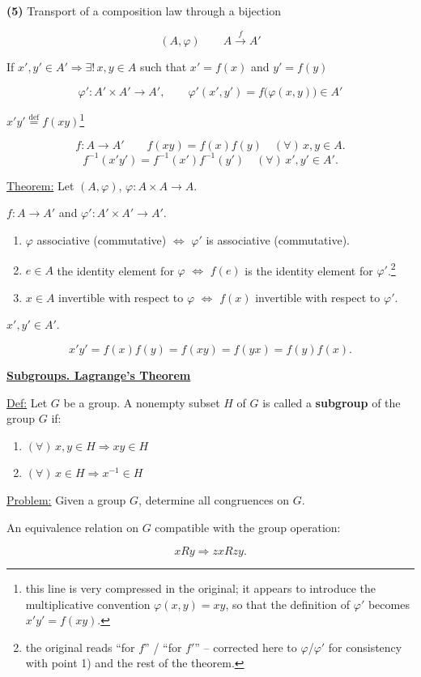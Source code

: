 \documentclass[12pt]{article}
\begin{document}
\noindent\textbf{(5)} Transport of a composition law through a bijection

\[
(A,\varphi) \qquad A \xrightarrow{f} A'
\]

\noindent If $x',y'\in A' \Rightarrow \exists!\, x,y\in A$ such that $x'=f(x)$ and $y'=f(y)$

\[
\varphi' : A'\times A' \to A', \qquad \varphi'(x',y') = f\big(\varphi(x,y)\big) \in A'
\]

\noindent [notation: $\varphi(x,y)=xy$] \quad $x'y' \overset{\text{def}}{=} f(xy)$\footnote{this line is very compressed in the original; it appears to introduce the multiplicative convention $\varphi(x,y)=xy$, so that the definition of $\varphi'$ becomes $x'y'=f(xy)$.}

\[
f : A\to A' \qquad f(xy) = f(x)f(y) \quad (\forall)\,x,y\in A.
\]
\[
f^{-1}(x'y') = f^{-1}(x')f^{-1}(y') \quad (\forall)\,x',y'\in A'.
\]

\bigskip
\noindent\underline{Theorem:} Let $(A,\varphi)$, $\varphi:A\times A\to A$.

\noindent $f:A\to A'$ and $\varphi':A'\times A'\to A'$.

\begin{enumerate}
\item[1)] $\varphi$ associative (commutative) $\Leftrightarrow$ $\varphi'$ is associative (commutative).
\item[2)] $e\in A$ the identity element for $\varphi$ $\Leftrightarrow$ $f(e)$ is the identity element for $\varphi'$.\footnote{the original reads ``for $f$'' / ``for $f'$'' -- corrected here to $\varphi$/$\varphi'$ for consistency with point 1) and the rest of the theorem.}
\item[3)] $x\in A$ invertible with respect to $\varphi$ $\Leftrightarrow$ $f(x)$ invertible with respect to $\varphi'$.
\end{enumerate}

\noindent $x',y'\in A'$.

\[
x'y' = f(x)f(y) = f(xy) = f(yx) = f(y)f(x).
\]

\bigskip
\begin{center}
\end{center}

\noindent\underline{\textbf{Subgroups. Lagrange's Theorem}}

\bigskip
\noindent\underline{Def:} Let $G$ be a group. A nonempty subset $H$ of $G$ is called a \textbf{subgroup} of the group $G$ if:

\begin{enumerate}
\item[(1)] $(\forall)\,x,y\in H \Rightarrow xy\in H$
\item[(2)] $(\forall)\,x\in H \Rightarrow x^{-1}\in H$
\end{enumerate}

\bigskip
\noindent\underline{Problem:} Given a group $G$, determine all congruences on $G$.

\noindent An equivalence relation on $G$ compatible with the group operation:

\[
xRy \Rightarrow zxRzy.
\]
\end{document}

